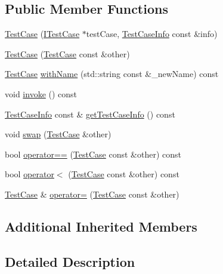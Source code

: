 \subsection*{Public Member Functions}
\begin{DoxyCompactItemize}
\item 
\hyperlink{class_catch_1_1_test_case_a03a5b913484681bd6d398dc5e9c2a907}{Test\+Case} (\hyperlink{struct_catch_1_1_i_test_case}{I\+Test\+Case} $\ast$test\+Case, \hyperlink{struct_catch_1_1_test_case_info}{Test\+Case\+Info} const \&info)
\item 
\hyperlink{class_catch_1_1_test_case_ac0011d3789edc3e44edb41f13c4775a0}{Test\+Case} (\hyperlink{class_catch_1_1_test_case}{Test\+Case} const \&other)
\item 
\hyperlink{class_catch_1_1_test_case}{Test\+Case} \hyperlink{class_catch_1_1_test_case_a0812e8a216d09b087d5874687009f0d6}{with\+Name} (std\+::string const \&\+\_\+new\+Name) const
\item 
void \hyperlink{class_catch_1_1_test_case_a26f346c8446dded0562fe3818ae71651}{invoke} () const
\item 
\hyperlink{struct_catch_1_1_test_case_info}{Test\+Case\+Info} const  \& \hyperlink{class_catch_1_1_test_case_a1ea0d79f49156cebea076fe1ba50d2b6}{get\+Test\+Case\+Info} () const
\item 
void \hyperlink{class_catch_1_1_test_case_aee38f908faf10b905b209ca388275413}{swap} (\hyperlink{class_catch_1_1_test_case}{Test\+Case} \&other)
\item 
bool \hyperlink{class_catch_1_1_test_case_a5456d03a90f75292835c158f3a3374a1}{operator==} (\hyperlink{class_catch_1_1_test_case}{Test\+Case} const \&other) const
\item 
bool \hyperlink{class_catch_1_1_test_case_a030e4b9282e9b32e08c8bd5e5cd6fa98}{operator$<$} (\hyperlink{class_catch_1_1_test_case}{Test\+Case} const \&other) const
\item 
\hyperlink{class_catch_1_1_test_case}{Test\+Case} \& \hyperlink{class_catch_1_1_test_case_a8022e3f74232f7887d2d2cbbc8876502}{operator=} (\hyperlink{class_catch_1_1_test_case}{Test\+Case} const \&other)
\end{DoxyCompactItemize}
\subsection*{Additional Inherited Members}


\subsection{Detailed Description}



